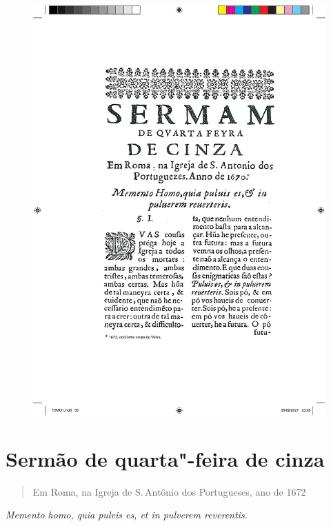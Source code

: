 \pagebreak
\thispagestyle{empty}
\movetoevenpage
\begin{figure}
\includegraphics[width=\textwidth]{./imgs/cinza.pdf}  
\end{figure}

\chapter{Sermão de quarta"-feira de cinza}

\begin{quotation}
\noindent{}Em Roma, na Igreja de S.\,Antônio dos Portugueses, ano de 1672
\end{quotation}

\epigraph{\emph{Memento homo, quia pulvis es, et in pulverem reverentis}.\footnotemark}{}

